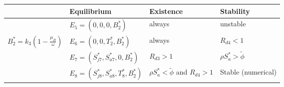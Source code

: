 \scriptsize{
\setlength{\arrayrulewidth}{.25mm}
\renewcommand{\arraystretch}{1.8}
\begin{tabular}{|m{2.5cm} |m{2.89cm}|m{1.7cm}|m{2.3cm}|} 
\hline
\rule{0pt}{.3cm} &Equilibrium & Existence & Stability \\
\hline

\rule{0pt}{.3cm} &$E_5= (0,0,0,B^*_2)$ & always & unstable\\

\rule{0pt}{.3cm} $B^*_2 = k_3\left(1 - \displaystyle\frac{\mu_B}{\omega}\right)$ &$E_6= (0,0,T_2^*, B^*_2)$ & always & $R_{d4} < 1$\\

\rule{0pt}{.3cm}  &$E_7= (S_{j7}^*, S_{a7}^*, 0, B^*_2)$ & $ R_{d3} > 1$ & $\rho S^*_a > \tilde{\phi}$\\


\rule{0pt}{.3cm} &$E_8=(S_{j8}^*,S_{a8}^*,T_8^*,B^*_2)$ &  $\rho S^*_a < \tilde\phi$  and $R_{d4} > 1$ & Stable (numerical)\\




\hline
\end{tabular}}